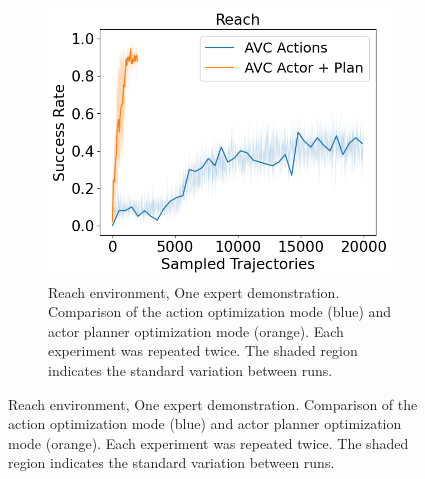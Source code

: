 \begin{figure}[htbp]
  \centering
  \begin{subfigure}{0.48\textwidth}
    \includegraphics[width=\textwidth]{images/Plan_vs_Actions/Reach.png}
    \caption{Reach environment, One expert demonstration. Comparison of the action optimization mode (blue) and actor planner optimization mode (orange).
    Each experiment was repeated twice. The shaded region indicates the standard variation between runs. }
  \end{subfigure}

  \hfill


\end{figure}
